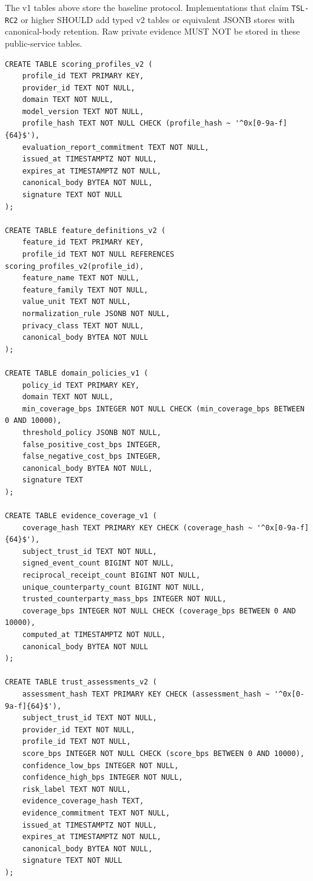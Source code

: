 \documentclass[11pt]{article}
\begin{document}
The v1 tables above store the baseline protocol. Implementations that claim \texttt{TSL-RC2} or higher SHOULD add typed v2 tables or equivalent JSONB stores with canonical-body retention. Raw private evidence MUST NOT be stored in these public-service tables.

\begin{lstlisting}[style=tslcode]
CREATE TABLE scoring_profiles_v2 (
    profile_id TEXT PRIMARY KEY,
    provider_id TEXT NOT NULL,
    domain TEXT NOT NULL,
    model_version TEXT NOT NULL,
    profile_hash TEXT NOT NULL CHECK (profile_hash ~ '^0x[0-9a-f]{64}$'),
    evaluation_report_commitment TEXT NOT NULL,
    issued_at TIMESTAMPTZ NOT NULL,
    expires_at TIMESTAMPTZ NOT NULL,
    canonical_body BYTEA NOT NULL,
    signature TEXT NOT NULL
);

CREATE TABLE feature_definitions_v2 (
    feature_id TEXT PRIMARY KEY,
    profile_id TEXT NOT NULL REFERENCES scoring_profiles_v2(profile_id),
    feature_name TEXT NOT NULL,
    feature_family TEXT NOT NULL,
    value_unit TEXT NOT NULL,
    normalization_rule JSONB NOT NULL,
    privacy_class TEXT NOT NULL,
    canonical_body BYTEA NOT NULL
);

CREATE TABLE domain_policies_v1 (
    policy_id TEXT PRIMARY KEY,
    domain TEXT NOT NULL,
    min_coverage_bps INTEGER NOT NULL CHECK (min_coverage_bps BETWEEN 0 AND 10000),
    threshold_policy JSONB NOT NULL,
    false_positive_cost_bps INTEGER,
    false_negative_cost_bps INTEGER,
    canonical_body BYTEA NOT NULL,
    signature TEXT
);

CREATE TABLE evidence_coverage_v1 (
    coverage_hash TEXT PRIMARY KEY CHECK (coverage_hash ~ '^0x[0-9a-f]{64}$'),
    subject_trust_id TEXT NOT NULL,
    signed_event_count BIGINT NOT NULL,
    reciprocal_receipt_count BIGINT NOT NULL,
    unique_counterparty_count BIGINT NOT NULL,
    trusted_counterparty_mass_bps INTEGER NOT NULL,
    coverage_bps INTEGER NOT NULL CHECK (coverage_bps BETWEEN 0 AND 10000),
    computed_at TIMESTAMPTZ NOT NULL,
    canonical_body BYTEA NOT NULL
);

CREATE TABLE trust_assessments_v2 (
    assessment_hash TEXT PRIMARY KEY CHECK (assessment_hash ~ '^0x[0-9a-f]{64}$'),
    subject_trust_id TEXT NOT NULL,
    provider_id TEXT NOT NULL,
    profile_id TEXT NOT NULL,
    score_bps INTEGER NOT NULL CHECK (score_bps BETWEEN 0 AND 10000),
    confidence_low_bps INTEGER NOT NULL,
    confidence_high_bps INTEGER NOT NULL,
    risk_label TEXT NOT NULL,
    evidence_coverage_hash TEXT,
    evidence_commitment TEXT NOT NULL,
    issued_at TIMESTAMPTZ NOT NULL,
    expires_at TIMESTAMPTZ NOT NULL,
    canonical_body BYTEA NOT NULL,
    signature TEXT NOT NULL
);


\end{lstlisting}
\end{document}
